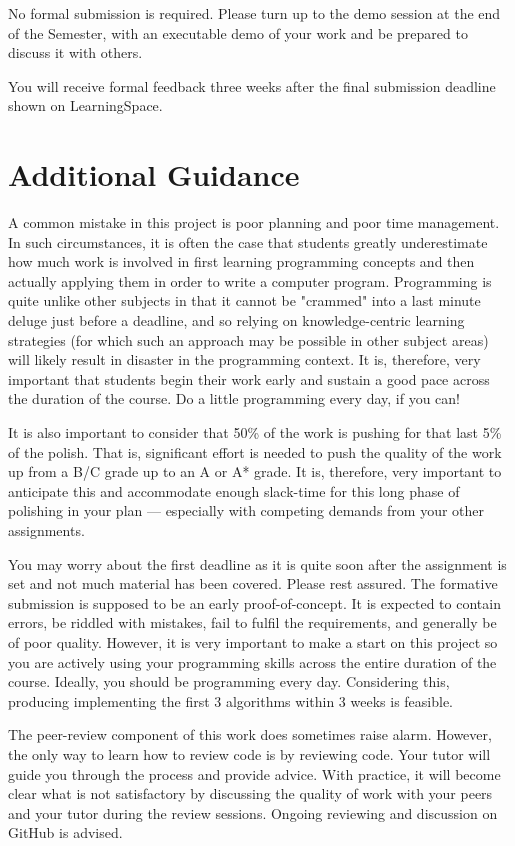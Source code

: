 \documentclass{../fal_assignment}
\begin{document}
No formal submission is required. Please turn up to the demo session at the end of the Semester, with an executable demo of your work and be prepared to discuss it with others.

You will receive formal feedback three weeks after the final submission deadline shown on LearningSpace.

\section*{Additional Guidance}

A common mistake in this project is poor planning and poor time management. In such circumstances, it is often the case that students greatly underestimate how much work is involved in first learning programming concepts and then actually applying them in order to write a computer program. Programming is quite unlike other subjects in that it cannot be "crammed" into a last minute deluge just before a deadline, and so relying on knowledge-centric learning strategies (for which such an approach may be possible in other subject areas) will likely result in disaster in the programming context. It is, therefore, very important that students begin their work early and sustain a good pace across the duration of the course. Do a little programming every day, if you can!

It is also important to consider that 50\% of the work is pushing for that last 5\% of the polish. That is, significant effort is needed to push the quality of the work up from a B/C grade up to an A or A* grade. It is, therefore, very important to anticipate this and accommodate enough slack-time for this long phase of polishing in your plan --- especially with competing demands from your other assignments.

You may worry about the first deadline as it is quite soon after the assignment is set and not much material has been covered. Please rest assured. The formative submission is supposed to be an early proof-of-concept. It is expected to contain errors, be riddled with mistakes, fail to fulfil the requirements, and generally be of poor quality. However, it is very important to make a start on this project so you are actively using your programming skills across the entire duration of the course. Ideally, you should be programming every day. Considering this, producing implementing the first 3 algorithms within 3 weeks is feasible.

The peer-review component of this work does sometimes raise alarm. However, the only way to learn how to review code is by reviewing code. Your tutor will guide you through the process and provide advice. With practice, it will become clear what is not satisfactory by discussing the quality of work with your peers and your tutor during the review sessions. Ongoing reviewing and discussion on GitHub is advised.
\end{document}
